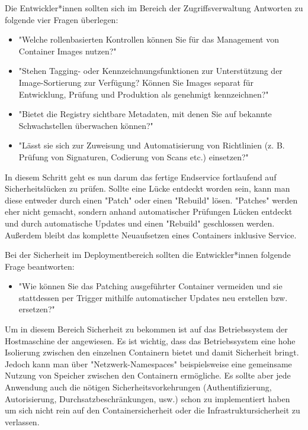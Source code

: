 Die Entwickler*innen sollten sich im Bereich der Zugriffsverwaltung Antworten zu folgende vier Fragen überlegen:

\begin{itemize}
    \item "Welche rollenbasierten Kontrollen können Sie für das Management von Container Images nutzen?" \cite{ContainerSecurity}
    \item "Stehen Tagging- oder Kennzeichnungsfunktionen zur Unterstützung der Image-Sortierung zur Verfügung? Können Sie Images separat für Entwicklung, Prüfung und Produktion als genehmigt kennzeichnen?" \cite{ContainerSecurity}
    \item "Bietet die Registry sichtbare Metadaten, mit denen Sie auf bekannte Schwachstellen überwachen können?" \cite{ContainerSecurity}
    \item "Lässt sie sich zur Zuweisung und Automatisierung von Richtlinien (z. B. Prüfung von Signaturen, Codierung von Scans etc.) einsetzen?" \cite{ContainerSecurity}
\end{itemize}


In diesem Schritt geht es nun darum das fertige Endservice fortlaufend auf Sicherheitslücken zu prüfen. Sollte eine Lücke entdeckt worden sein, kann man diese entweder durch einen "Patch" oder einen "Rebuild" lösen. "Patches" werden eher nicht gemacht, sondern anhand automatischer Prüfungen Lücken entdeckt und durch automatische Updates und einen "Rebuild" geschlossen werden. Außerdem bleibt das komplette Neuaufsetzen eines Containers inklusive Service. \cite{ContainerSecurity}

Bei der Sicherheit im Deploymentbereich sollten die Entwickler*innen folgende Frage beantworten:

\begin{itemize}
    \item "Wie können Sie das Patching ausgeführter Container vermeiden und sie stattdessen per Trigger mithilfe automatischer Updates neu erstellen bzw. ersetzen?" \cite{ContainerSecurity}
\end{itemize}

\cite{ContainerSecurity}


Um in diesem Bereich Sicherheit zu bekommen ist auf das Betriebssystem der Hostmaschine der angewiesen. Es ist wichtig, dass das Betriebssystem eine hohe Isolierung zwischen den einzelnen Containern bietet und damit Sicherheit bringt. Jedoch kann man über "Netzwerk-Namespaces" beispielsweise eine gemeinsame Nutzung von Speicher zwischen den Containern ermögliche. Es sollte aber jede Anwendung auch die nötigen Sicherheitsvorkehrungen (Authentifizierung, Autorisierung, Durchsatzbeschränkungen, usw.) schon zu implementiert haben um sich nicht rein auf den Containersicherheit oder die Infrastruktursicherheit zu verlassen. \cite{ContainerSecurity}

